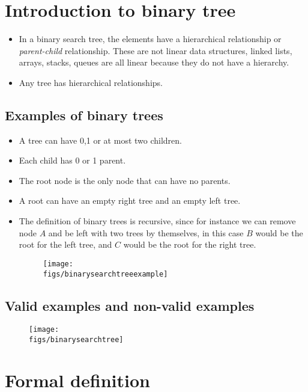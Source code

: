\section{Introduction to binary tree}
\begin{itemize}
    \item In a binary search tree, the elements have a hierarchical relationship or \emph{parent-child} relationship. These are not linear data structures, linked lists, arrays, stacks, queues are all linear because they do not have a hierarchy. 
    \item Any tree has hierarchical relationships. 
\end{itemize}

\subsection{Examples of binary trees}
\begin{itemize}
    \item A tree can have 0,1 or at most two children.
    \item Each child has 0 or 1 parent. 
    \item The root node is the only node that can have no parents. 
    \item A root can have an empty right tree and an empty left tree. 
    \item The definition of binary trees is recursive, since for instance we can remove node $A$ and be left with two trees by themselves, in this case $B$ would be the root for the left tree, and $C$ would be the root for the right tree. 
        \begin{figure}[H]
            \centering
            \texttt{[image: \\figs/binarysearchtreeexample]} 
        \end{figure}
\end{itemize}

\subsection{Valid examples and non-valid examples}
\begin{figure}[H]
    \centering
    \texttt{[image: \\figs/binarysearchtree]}
\end{figure}

\section{Formal definition}


